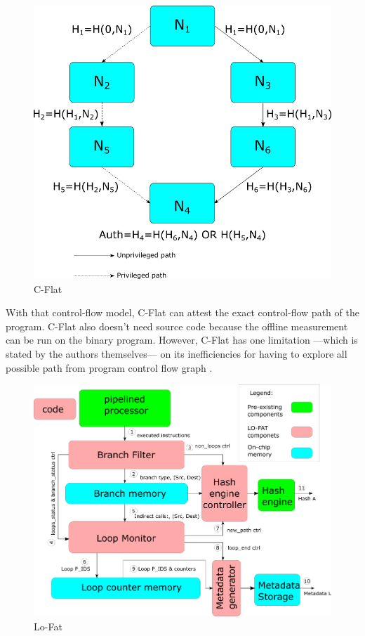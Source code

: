 \begin{figure}[htbp]
\centerline{\includegraphics[scale=.5]{Figures/01/cflat-overview.png}}
\caption{C-Flat}
\label{fig:c-flat}
\end{figure}

With that control-flow model, C-Flat can attest the exact control-flow path of
the program. C-Flat also doesn't need source code because the offline
measurement can be run on the binary program. However, C-Flat has one limitation
---which is stated by the authors themselves--- on its inefficiencies for having
to explore all possible path from program control flow graph
\cite{aberaCFLATControlFlowAttestation2016}.

\begin{figure}[htbp]
\centerline{\includegraphics[scale=.5]{Figures/01/lofat-overview.png}}
\caption{Lo-Fat}
\label{fig:lo-fat}
\end{figure}

